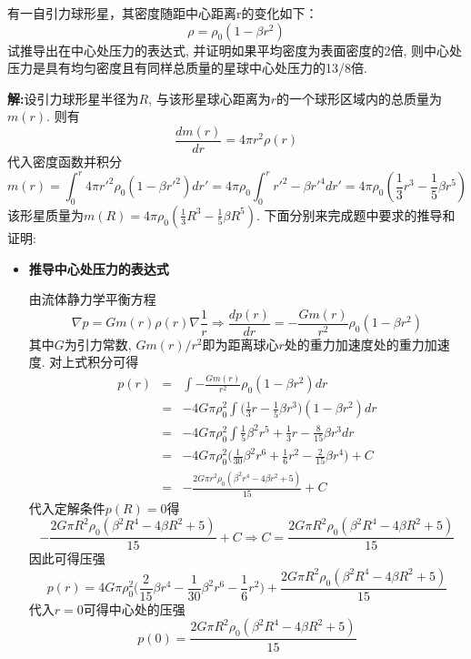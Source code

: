 \begin{problem}[问题4.2]
有一自引力球形星，其密度随距中心距离r的变化如下：
\[
\rho = \rho_0(1-\beta r^2)
\]
试推导出在中心处压力的表达式, 并证明如果平均密度为表面密度的2倍, 则中心处压力是具有均匀密度且有同样总质量的星球中心处压力的13/8倍.
\end{problem}

\begin{solution}
\textbf{解:}设引力球形星半径为$R$, 与该形星球心距离为$r$的一个球形区域内的总质量为$m(r)$. 则有
\begin{equation}\label{dmdr}
\frac{dm(r)}{dr} = 4\pi r^2\rho(r)
\end{equation}
代入密度函数并积分
\[
m(r) = \int_0^r4\pi r'^2\rho_0(1-\beta r'^2)dr'
= 4\pi\rho_0\int_0^r r'^2-\beta r'^4dr'
= 4\pi\rho_0(\frac{1}{3}r^3-\frac{1}{5}\beta r^5 )
\]
该形星质量为$m(R) = 4\pi\rho_0(\frac{1}{3}R^3-\frac{1}{5}\beta R^5 )$. 下面分别来完成题中要求的推导和证明:

\begin{itemize}
\item \textbf{推导中心处压力的表达式}

由流体静力学平衡方程
\[
\nabla p = Gm(r)\rho(r)\nabla \frac{1}{r} \Longrightarrow \frac{dp(r)}{dr}= -\frac{Gm(r)}{r^2}\rho_0(1-\beta r^2)
\]
其中$G$为引力常数, $Gm(r)/r^2$即为距离球心$r$处的重力加速度处的重力加速度. 对上式积分可得
\begin{eqnarray}
p(r) & = & \int -\frac{Gm(r)}{r^2}\rho_0(1-\beta r^2) dr \nonumber\\
     & = & -4G\pi\rho_0^2\int\Big(\frac{1}{3}r-\frac{1}{5}\beta r^3\Big)(1-\beta r^2) dr\nonumber\\
     & = & -4G\pi\rho_0^2\int \frac{1}{5}\beta^2r^5 + \frac{1}{3}r -\frac{8}{15}\beta r^3 dr\nonumber\\
     & = & -4G\pi\rho_0^2\Big(\frac{1}{30}\beta^2r^6 +\frac{1}{6}r^2 -\frac{2}{15}\beta r^4\Big) + C\nonumber\\
     & = & -\frac{2G\pi r^2\rho_0(\beta^2r^4 - 4\beta r^2 + 5)}{15} + C\nonumber
\end{eqnarray}
代入定解条件$p(R)=0$得
\[
-\frac{2G\pi R^2\rho_0(\beta^2R^4 - 4\beta R^2 + 5)}{15} + C \Longrightarrow
C = \frac{2G\pi R^2\rho_0(\beta^2R^4 - 4\beta R^2 + 5)}{15}
\]
因此可得压强
\[
p(r) = 4G\pi\rho_0^2\Big(\frac{2}{15}\beta r^4 - \frac{1}{30}\beta^2r^6 -\frac{1}{6}r^2\Big) + \frac{2G\pi R^2\rho_0(\beta^2R^4 - 4\beta R^2 + 5)}{15}
\]
代入$r=0$可得中心处的压强
\begin{equation}\label{p_0}
p(0) = \frac{2G\pi R^2\rho_0(\beta^2R^4 - 4\beta R^2 + 5)}{15}
\end{equation}


\end{itemize}
\end{solution}
